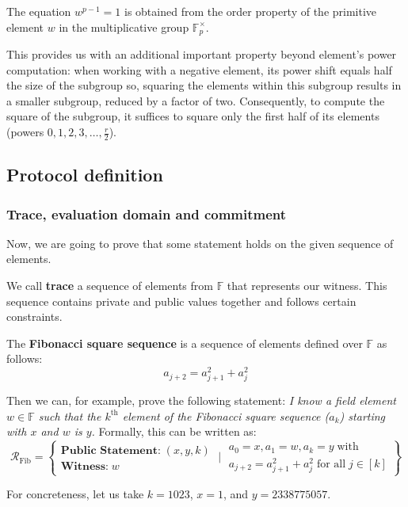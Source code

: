 \documentclass[../lecture-notes.tex]{subfiles}
\begin{document}
\begin{remark}
The equation $w^{p - 1} = 1$ is obtained from the order property of the
primitive element $w$ in the multiplicative group $\mathbb{F}^{\times}_p$. 
\end{remark}
\begin{remark}
This provides us with an additional important property beyond element's power
computation: when working with a negative element, its power shift equals half
the size of the subgroup so, squaring the elements within this subgroup results
in a smaller subgroup, reduced by a factor of two. Consequently, to compute the
square of the subgroup, it suffices to square only the first half of its
elements (powers $0, 1, 2, 3, \dots, \frac{r}{2}$).
\end{remark}

\subsection{Protocol definition}

\subsubsection{Trace, evaluation domain and commitment}
Now, we are going to prove that some statement holds on the given sequence of elements.

\begin{definition}
We call \textbf{trace} a sequence of elements from $\mathbb{F}$ that represents our witness. This sequence contains private and public values together and follows certain constraints.
\end{definition}

\begin{example}
The \textbf{Fibonacci square sequence} is a sequence of elements defined over
$\mathbb{F}$ as follows: 
\begin{equation*}
a_{j+2} = a_{j+1}^2 + a_{j}^2  
\end{equation*}

Then we can, for example, prove the following statement: \textcolor{blue!60!black}{\textit{I know a field
element $w \in \mathbb{F}$ such that the $k^{\text{th}}$ element of the Fibonacci
square sequence ($a_k$) starting with $x$ and $w$ is $y$.}} Formally,
this can be written as:
\begin{equation*}
    \mathcal{R}_{\text{Fib}} = \left\{ \begin{matrix}
        \textbf{Public Statement:} \; (x, y, k) \\
        \textbf{Witness:} \; w  
    \end{matrix} \;\Big|\;  \begin{matrix}
        a_0 = x, a_1 = w, a_k = y \; \text{with} \\ a_{j+2} = a_{j+1}^2 + a_j^2 \; \text{for all} \; j \in [k] 
    \end{matrix}    
    \right\}
\end{equation*} 

For concreteness, let us take $k=1023$, $x = 1$, and $y=2338775057$.
\end{example}
\end{document}
